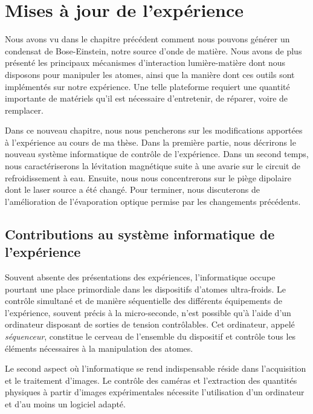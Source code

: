 \chapter{Mises à jour de l'expérience}
\label{ch:new_exp}

Nous avons vu dans le chapitre précédent comment nous pouvons générer un condensat de Bose-Einstein, notre source d'onde de matière. Nous avons de plus présenté les principaux mécanismes d'interaction lumière-matière dont nous disposons pour manipuler les atomes, ainsi que la manière dont ces outils sont implémentés sur notre expérience. Une telle plateforme requiert une quantité importante de matériels qu'il est nécessaire d'entretenir, de réparer, voire de remplacer. 

Dans ce nouveau chapitre, nous nous pencherons sur les modifications apportées à l'expérience au cours de ma thèse. Dans la première partie, nous décrirons le nouveau système informatique de contrôle de l'expérience. Dans un second temps, nous caractériserons la lévitation magnétique suite à une avarie sur le circuit de refroidissement à eau. Ensuite, nous nous concentrerons sur le piège dipolaire dont le laser source a été changé. Pour terminer, nous discuterons de l'amélioration de l'évaporation optique permise par les changements précédents.

\section{Contributions au système informatique de l'expérience}
Souvent absente des présentations des expériences, l'informatique occupe pourtant une place primordiale dans les dispositifs d'atomes ultra-froids. Le contrôle simultané et de manière séquentielle des différents équipements de l'expérience, souvent précis à la micro-seconde, n'est possible qu'à l'aide d'un ordinateur disposant de sorties de tension contrôlables. Cet ordinateur, appelé \emph{séquenceur}, constitue le cerveau de l'ensemble du dispositif et contrôle tous les éléments nécessaires à la manipulation des atomes.

Le second aspect où l'informatique se rend indispensable réside dans l'acquisition et le traitement d'images. Le contrôle des caméras et l'extraction des quantités physiques à partir d'images expérimentales nécessite l'utilisation d'un ordinateur et d'au moins un logiciel adapté. 


